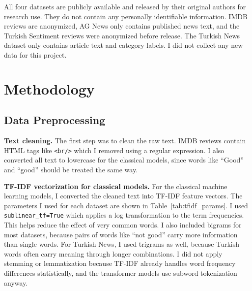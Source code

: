 \documentclass[conference]{IEEEtran}
\begin{document}
All four datasets are publicly available and released by their original authors for research
use. They do not contain any personally identifiable information. IMDB reviews are
anonymized, AG News only contains published news text, and the Turkish Sentiment reviews
were anonymized before release. The Turkish News dataset only contains article text and
category labels. I did not collect any new data for this project.

\section{Methodology}
\label{sec:methodology}

\subsection{Data Preprocessing}

\textbf{Text cleaning.} The first step was to clean the raw text. IMDB reviews contain HTML
tags like \texttt{<br/>} which I removed using a regular expression. I also converted all
text to lowercase for the classical models, since words like ``Good'' and ``good'' should be
treated the same way.

\textbf{TF-IDF vectorization for classical models.} For the classical machine learning
models, I converted the cleaned text into TF-IDF feature vectors. The parameters I used
for each dataset are shown in Table~\ref{tab:tfidf_params}. I used \texttt{sublinear\_tf=True}
which applies a log transformation to the term frequencies. This helps reduce the effect of
very common words. I also included bigrams for most datasets, because pairs of words like
``not good'' carry more information than single words. For Turkish News, I used trigrams
as well, because Turkish words often carry meaning through longer combinations. I did not
apply stemming or lemmatization because TF-IDF already handles word frequency differences
statistically, and the transformer models use subword tokenization anyway.
\end{document}
